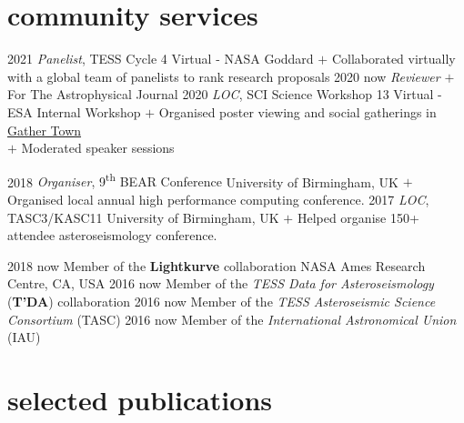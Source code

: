 \documentclass[letterpaper]{k-cv} %
\begin{document}
\clearpage

\section{\color{c1}community services}
\begin{entrylist}
	\centry
	{2021}
	{\emph{\textcolor{c1}{Panelist}}, TESS Cycle 4}
	{Virtual - NASA Goddard}
	{$+$ Collaborated virtually with a global team of panelists to rank research proposals}
		\centry
	{2020 \to now}
	{\emph{\textcolor{c1}{Reviewer}}}
	{}
	{$+$ For The Astrophysical Journal}
	\centry
	{2020}
	{\emph{LOC}, SCI Science Workshop 13}
	{Virtual - ESA Internal Workshop}
	{$+$ Organised poster viewing and social gatherings in \href{https://gather.town/}{Gather Town}\\
		$+$ Moderated speaker sessions}


	\centry
	{2018 }
	{\emph{Organiser}, 9\textsuperscript{th} BEAR Conference}
	{University of Birmingham, UK}
	{$+$ Organised local annual high performance computing conference.}	
	\centry
	{2017}
	{\emph{LOC}, TASC3/KASC11}
	{University of Birmingham, UK}
	{$+$ Helped organise 150+ attendee asteroseismology conference.}

	\centrythree
	{2018 \to now}
	{Member of the \textbf{\textcolor{c1}{Lightkurve}} collaboration}
	{NASA Ames Research Centre, CA, USA}
	\centrythree
	{2016 \to now}
	{Member of the \emph{TESS Data for Asteroseismology} (\textbf{\textcolor{c1}{T'DA}}) collaboration }
	{}
	\centrythree
	{2016 \to now}
	{Member of the \emph{TESS Asteroseismic Science Consortium} (TASC)}
	{}
	\centrythree
	{2016 \to now}
	{Member of the \emph{International Astronomical Union} (IAU)}
	{}	
\end{entrylist}



\vspace{0.5cm}
\section{\color{c1}selected publications}
\end{document}
